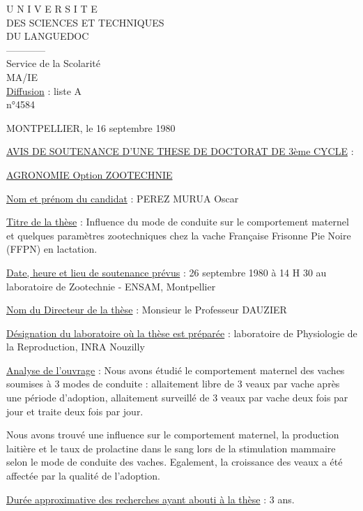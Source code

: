 
\begin{flushleft}
U N I V E R S I T E\\
DES SCIENCES ET TECHNIQUES\\
DU LANGUEDOC\\
------------\\
Service de la Scolarité\\
MA/IE\\
\uline{Diffusion} : liste A\\
n°4584
\end{flushleft}
\begin{flushright}MONTPELLIER, le 16 septembre 1980\end{flushright}

\begin{center}
\uline{AVIS DE SOUTENANCE D'UNE THESE DE DOCTORAT DE 3ème CYCLE} :

\uline{AGRONOMIE Option ZOOTECHNIE}
\end{center}

\uline{Nom et prénom du candidat} : PEREZ MURUA Oscar

\uline{Titre de la thèse} : Influence du mode de conduite sur le comportement maternel et quelques paramètres zootechniques chez la vache Française Frisonne Pie Noire (FFPN) en lactation.

\uline{Date, heure et lieu de soutenance prévus} : 26 septembre 1980 à 14 H 30 au laboratoire de Zootechnie - ENSAM, Montpellier

\uline{Nom du Directeur de la thèse} : Monsieur le Professeur DAUZIER

\uline{Désignation du laboratoire où la thèse est préparée} : laboratoire de Physiologie de la Reproduction, INRA Nouzilly

\uline{Analyse de l'ouvrage} : Nous avons étudié le comportement maternel des vaches soumises à 3 modes de conduite : allaitement libre de 3 veaux par vache après une période d'adoption, allaitement surveillé de 3 veaux par vache deux fois par jour et traite deux fois par jour.

Nous avons trouvé une influence sur le comportement maternel, la production laitière et le taux de prolactine dans le sang lors de la stimulation mammaire selon le mode de conduite des vaches. Egalement, la croissance des veaux a été affectée par la qualité de l'adoption.

\uline{Durée approximative des recherches ayant abouti à la thèse} : 3 ans.

